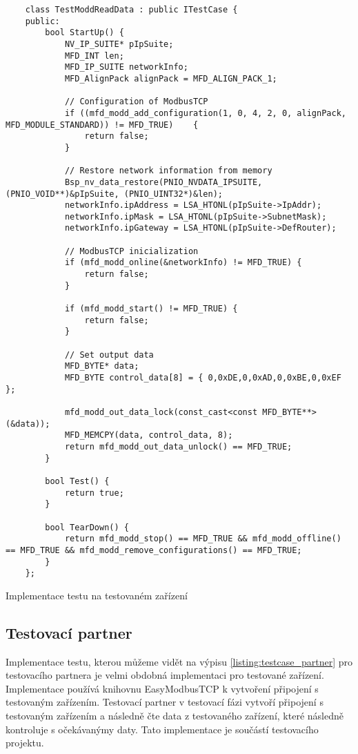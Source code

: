 \begin{listing}[htbp]
    \centering
    \begin{verbatim}
    class TestModdReadData : public ITestCase {
    public:
        bool StartUp() {
            NV_IP_SUITE* pIpSuite;
            MFD_INT len;
            MFD_IP_SUITE networkInfo;
            MFD_AlignPack alignPack = MFD_ALIGN_PACK_1;

            // Configuration of ModbusTCP
            if ((mfd_modd_add_configuration(1, 0, 4, 2, 0, alignPack, MFD_MODULE_STANDARD)) != MFD_TRUE)    { 
                return false; 
            }

            // Restore network information from memory
            Bsp_nv_data_restore(PNIO_NVDATA_IPSUITE, (PNIO_VOID**)&pIpSuite, (PNIO_UINT32*)&len);
            networkInfo.ipAddress = LSA_HTONL(pIpSuite->IpAddr);
            networkInfo.ipMask = LSA_HTONL(pIpSuite->SubnetMask);
            networkInfo.ipGateway = LSA_HTONL(pIpSuite->DefRouter);

            // ModbusTCP inicialization
            if (mfd_modd_online(&networkInfo) != MFD_TRUE) {
                return false;
            }

            if (mfd_modd_start() != MFD_TRUE) {
                return false;
            }
            
            // Set output data
            MFD_BYTE* data;
            MFD_BYTE control_data[8] = { 0,0xDE,0,0xAD,0,0xBE,0,0xEF };
            
            mfd_modd_out_data_lock(const_cast<const MFD_BYTE**>(&data));
            MFD_MEMCPY(data, control_data, 8);
            return mfd_modd_out_data_unlock() == MFD_TRUE;
        }

        bool Test() {
            return true;
        }

        bool TearDown() {
            return mfd_modd_stop() == MFD_TRUE && mfd_modd_offline() == MFD_TRUE && mfd_modd_remove_configurations() == MFD_TRUE;
        }
    };
    \end{verbatim}
\caption{Implementace testu na testovaném zařízení}
\label{listing:testcase_device}
\end{listing}


\subsection{Testovací partner}
Implementace testu, kterou můžeme vidět na výpisu \ref{listing:testcase_partner} pro testovacího partnera je velmi obdobná implementaci pro testované zařízení. Implementace používá knihovnu EasyModbusTCP k vytvoření připojení s testovaným zařízením. 
Testovací partner v testovací fázi vytvoří připojení s testovaným zařízením a následně čte data z testovaného zařízení, které následně kontroluje s očekávanýmy daty. Tato implementace je součástí testovacího projektu.


